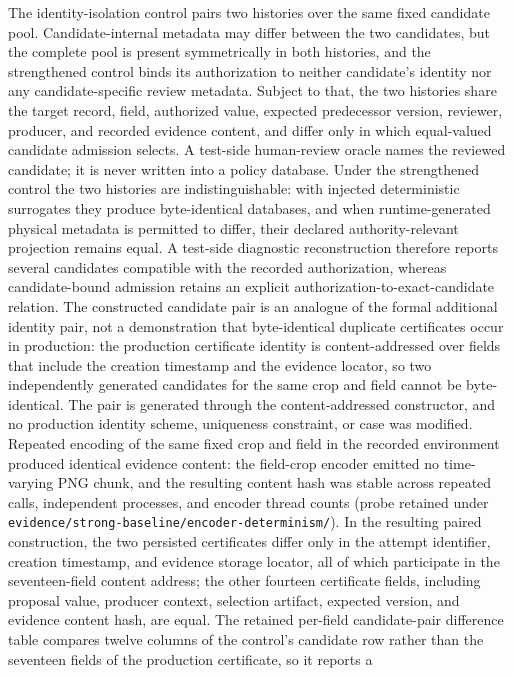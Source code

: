 \documentclass[preprint,12pt,authoryear]{elsarticle}
\newcommand{\code}[1]{\nolinkurl{#1}}
\begin{document}
The identity-isolation control pairs two histories over the same fixed candidate
pool. Candidate-internal metadata may differ between the two candidates, but the
complete pool is present symmetrically in both histories, and the strengthened
control binds its authorization to neither candidate's identity nor any
candidate-specific review metadata. Subject to that, the two histories share the
target record, field, authorized value, expected predecessor version, reviewer,
producer, and recorded evidence content, and differ only in which equal-valued
candidate admission selects. A test-side human-review oracle names the reviewed
candidate; it is never written into a policy database. Under the strengthened
control the two histories are indistinguishable: with injected deterministic
surrogates they produce byte-identical databases, and when runtime-generated
physical metadata is permitted to differ, their declared authority-relevant
projection remains equal. A test-side diagnostic reconstruction therefore reports
several candidates compatible with the recorded authorization, whereas
candidate-bound admission retains an explicit
authorization-to-exact-candidate relation. The constructed candidate pair is
an analogue of the formal additional
identity pair, not a demonstration that byte-identical duplicate certificates
occur in production: the production certificate identity is content-addressed
over fields that include the creation timestamp and the evidence locator, so two
independently generated candidates for the same crop and field cannot be
byte-identical. The pair is generated through the content-addressed constructor,
and no production identity scheme, uniqueness constraint, or case was modified.
Repeated encoding of the same fixed crop and field in the recorded environment
produced identical evidence content: the field-crop encoder emitted no
time-varying PNG chunk, and the resulting content hash was stable across repeated
calls, independent processes, and encoder thread counts (probe retained under
\code{evidence/strong-baseline/encoder-determinism/}). In the resulting paired
construction, the two persisted certificates differ only in the attempt
identifier, creation timestamp, and evidence storage locator, all of which
participate in the seventeen-field content address; the other fourteen
certificate fields, including proposal value, producer context, selection
artifact, expected version, and evidence content hash, are equal. The retained per-field candidate-pair difference table compares twelve columns of the control's
candidate row rather than the seventeen fields of the production certificate, so it reports a
\end{document}
